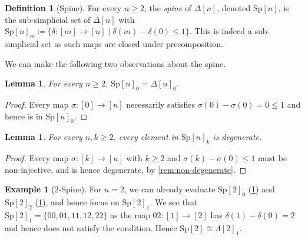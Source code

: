 \documentclass[11pt, a4paper]{amsart}
\newcommand{\Sp}{\mathrm{Sp}}
\newtheorem{lemma}[equation]{Lemma}
\theoremstyle{definition}
\newtheorem{definition}[equation]{Definition}
\newtheorem{example}[equation]{Example}
\theoremstyle{remark}
\numberwithin{equation}{section}
\begin{document}
\begin{definition}[Spine] \label{def:spine}
  For every $n \geq 2$, the \emph{spine} of $\Delta[n]$, denoted $\Sp[n]$, is the sub-simplicial set of $\Delta[n]$ with $\Sp[n]_m \coloneq \{ \delta\colon [m] \to [n] \mid \delta(m) - \delta(0) \leq 1 \}$. This is indeed a sub-simplicial set as such maps are closed under precomposition.
\end{definition}

We can make the following two observations about the spine.

\begin{lemma} \label{lemma:spine zero}
  For every $n \geq 2$, $\Sp[n]_0 = \Delta[n]_0$.
\end{lemma}

\begin{proof}
  Every map $\sigma\colon [0] \to [n]$ necessarily satisfies $\sigma(0) - \sigma(0) = 0 \leq 1$ and hence is in $\Sp[n]_0$. 
\end{proof}

\begin{lemma} \label{lemma:spine bigger 2}
  For every $n,k \geq 2$, every element in $\Sp[n]_k$ is degenerate. 
\end{lemma}

\begin{proof}
  Every map $\sigma\colon [k] \to [n]$ with $k \geq 2$ and $\sigma(k) - \sigma(0) \leq 1$ must be non-injective, and is hence degenerate, by \cref{rem:non-degenerate}.
\end{proof}

\begin{example}[2-Spine]
 For $n = 2$, we can already evaluate $\Sp[2]_0$ (\cref{lemma:spine zero}) and $\Sp[2]_2$ (\cref{lemma:spine bigger 2}), and hence focus on $\Sp[2]_1$. We see that $\Sp[2]_1 = \{00,01,11,12,22\}$ as the map $02\colon [1] \to [2]$ has $\delta(1) - \delta(0) = 2$ and hence does not satisfy the condition. Hence $\Sp[2] \cong \Lambda[2]_1$. 
\end{example}
\end{document}
